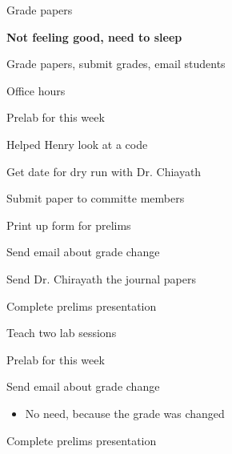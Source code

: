 \documentclass[idxtotoc,hyperref,openany,oneside]{labbook} %
\newcommand{\cmark}{\ding{51}}%
\newcommand{\done}{\rlap{$\square$}{\raisebox{2pt}{\large\hspace{1pt}\cmark}}%
  \hspace{-2.5pt}}
\begin{document}
\begin{todolist}
\item[\done]{Grade papers}
\end{todolist}





\textbf{Not feeling good, need to sleep}


\begin{todolist}
\item[\done]{Grade papers, submit grades, email students}
\item[\done]{Office hours}
\item{Prelab for this week}
\end{todolist}




\begin{todolist}
\item[\done]{Helped Henry look at a code}
\item[\done]{Get date for dry run with Dr. Chiayath}
\item[\done]{Submit paper to committe members}
\item[\done]{Print up form for prelims}
\item{Send email about grade change}
\item[\done]{Send Dr. Chirayath the journal papers}
\item{Complete prelims presentation}
\end{todolist}






\begin{todolist}
\item[\done]{Teach two lab sessions}
\item{Prelab for this week}
\end{todolist}


\begin{todolist}
\item{Send email about grade change}
  \begin{itemize}
  \item{No need, because the grade was changed}
  \end{itemize}
\item{Complete prelims presentation}
\end{todolist}
\end{document}
